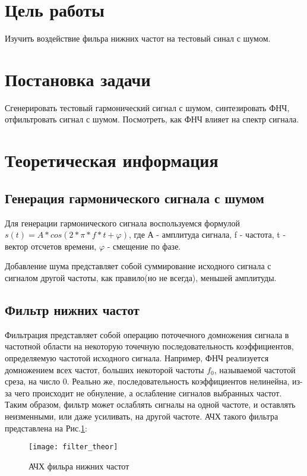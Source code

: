 







\section{Цель работы}
Изучить воздействие фильра нижних частот на тестовый синал с шумом.

\section{Постановка задачи}
Сгенерировать тестовый гармонический сигнал с шумом, синтезировать ФНЧ, отфильтровать сигнал с шумом. Посмотреть, как ФНЧ влияет на спектр сигнала.

\section{Теоретическая информация}
\subsection{Генерация гармонического сигнала с шумом}
Для генерации гармонического сигнала воспользуемся формулой $s(t) = A*cos(2*\pi * f*t + \varphi)$, где А - амплитуда сигнала, f - частота, t - вектор отсчетов времени, $\varphi$ - смещение по фазе.

Добавление шума представляет собой суммирование исходного сигнала с сигналом другой частоты, как правило(но не всегда), меньшей амплитуды.

\subsection{Фильтр нижних частот}
Фильтрация представляет собой операцию поточечного домножения сигнала в частотной области на некоторую точечную последовательность коэффициентов, определяемую частотой исходного сигнала. Например, ФНЧ реализуется домножением всех частот, больших некоторой частоты $f_0$, называемой частотой среза, на число 0. Реально же, последовательность коэффициентов нелинейна, из-за чего происходит не обнуление, а ослабление сигналов выбранных частот. Таким образом, фильтр может ослаблять сигналы на одной частоте, и оставлять неизменными, или даже усиливать, на другой частоте. АЧХ такого фильтра представлена на Рис.\ref{pic:filter_theor}:
\begin{figure}[H]
	\begin{center}
		\texttt{[image: filter\_theor]}
		\caption{АЧХ фильра нижних частот} 
		\label{pic:filter_theor} %
	\end{center}
\end{figure}

